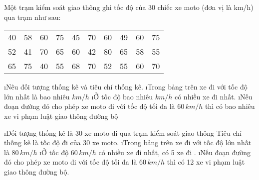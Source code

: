 \begin{bt}
	Một trạm kiểm soát giao thông ghi tốc độ của $30$ chiếc xe moto (đơn vị là km/h) qua trạm như sau: 
	\begin{center}
		\begin{tabular}{|c c c c c c c c c c|}
			\hline
			40 & 58 & 60 & 75 & 45 & 70 & 60 & 49 & 60& 75\\
			52 & 41 & 70 & 65 & 60 & 42 & 80 & 65 & 58 & 55 \\
			65 & 75 & 40 & 55 & 68 & 70 & 52 & 55 & 60 & 70\\
			\hline
		\end{tabular}
	\end{center}
	\begin{enumerate}[a),leftmargin=*]
		\i Nêu đối tượng thống kê và tiêu chí thống kê.
		\i Trong bảng trên xe đi với tốc độ lớn nhất là bao nhiêu $km/h$
		\i Ở tốc độ bao nhiêu $km/h$ có nhiều xe đi nhất.
		\i Nếu đoạn đường đó cho phép xe moto đi với tốc độ tối đa là $60\, km/h$ thì có bao nhiêu xe vi phạm luật giao thông đường bộ
	\end{enumerate}
	\begin{loigiaichuong39}
		\begin{enumerate}[a),leftmargin=*]
			\i Đối tượng thống kê là  30 xe moto đi qua trạm kiểm soát giao thông
			Tiêu chí thống kê là tốc độ đi của  30 xe moto.
			\i Trong bảng trên xe đi với tốc độ lớn nhất là  $80\, km/h$ 
			\i Ở tốc độ $60\, km/h$ có nhiều xe đi nhất, có  5 xe đi .
			\i Nếu đoạn đường đó cho phép xe moto đi với tốc độ tối đa là  $60 \,km/h$ thì có 12  xe vi phạm luật giao thông đường bộ.
		\end{enumerate}
	\end{loigiaichuong39}
\end{bt}
